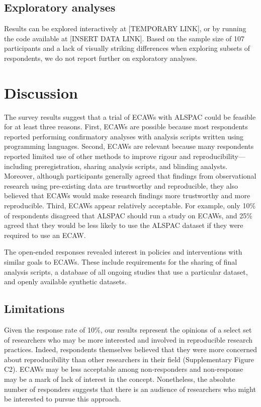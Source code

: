 \documentclass[
  man,floatsintext]{apa6}
\begin{document}
\hypertarget{exploratory-analyses}{%
\subsection{Exploratory analyses}\label{exploratory-analyses}}

Results can be explored interactively at {[}TEMPORARY LINK{]}, or by running the code available at {[}INSERT DATA LINK{]}. Based on the sample size of 107 participants and a lack of visually striking differences when exploring subsets of respondents, we do not report further on exploratory analyses.

\hypertarget{discussion}{%
\section{Discussion}\label{discussion}}

The survey results suggest that a trial of ECAWs with ALSPAC could be feasible for at least three reasons. First, ECAWs are possible because most respondents reported performing confirmatory analyses with analysis scripts written using programming languages. Second, ECAWs are relevant because many respondents reported limited use of other methods to improve rigour and reproducibility---including preregistration, sharing analysis scripts, and blinding analysts. Moreover, although participants generally agreed that findings from observational research using pre-existing data are trustworthy and reproducible, they also believed that ECAWs would make research findings more trustworthy and more reproducible. Third, ECAWs appear relatively acceptable. For example, only 10\% of respondents disagreed that ALSPAC should run a study on ECAWs, and 25\% agreed that they would be less likely to use the ALSPAC dataset if they were required to use an ECAW.

The open-ended responses revealed interest in policies and interventions with similar goals to ECAWs. These include requirements for the sharing of final analysis scripts, a database of all ongoing studies that use a particular dataset, and openly available synthetic datasets.

\hypertarget{limitations}{%
\subsection{Limitations}\label{limitations}}

Given the response rate of 10\%, our results represent the opinions of a select set of researchers who may be more interested and involved in reproducible research practices. Indeed, respondents themselves believed that they were more concerned about reproducibility than other researchers in their field (Supplementary Figure C2). ECAWs may be less acceptable among non-responders and non-response may be a mark of lack of interest in the concept. Nonetheless, the absolute number of responders suggests that there is an audience of researchers who might be interested to pursue this approach.
\end{document}
